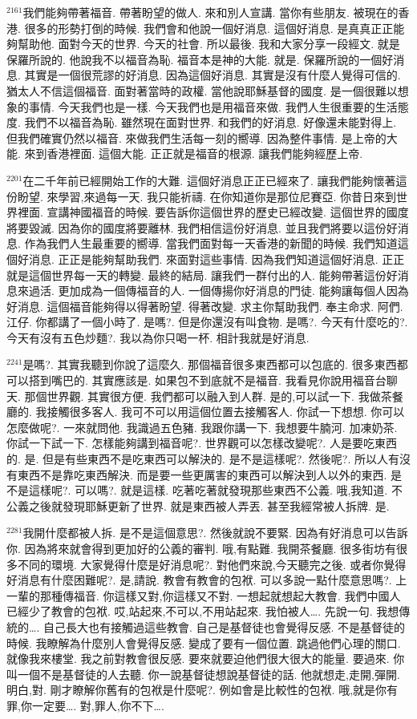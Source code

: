 \documentclass{book}
\begin{document}
$^{2161}$我們能夠帶著福音.
帶著盼望的做人.
來和別人宣講.
當你有些朋友.
被現在的香港.
很多的形勢打倒的時候.
我們會和他說一個好消息.
這個好消息.
是真真正正能夠幫助他.
面對今天的世界.
今天的社會.
所以最後.
我和大家分享一段經文.
就是保羅所說的.
他說我不以福音為恥.
福音本是神的大能.
就是.
保羅所說的一個好消息.
其實是一個很荒謬的好消息.
因為這個好消息.
其實是沒有什麼人覺得可信的.
猶太人不信這個福音.
面對著當時的政權.
當他說耶穌基督的國度.
是一個很難以想象的事情.
今天我們也是一樣.
今天我們也是用福音來做.
我們人生很重要的生活態度.
我們不以福音為恥.
雖然現在面對世界.
和我們的好消息.
好像還未能對得上.
但我們確實仍然以福音.
來做我們生活每一刻的嚮導.
因為整件事情.
是上帝的大能.
來到香港裡面.
這個大能.
正正就是福音的根源.
讓我們能夠經歷上帝.

$^{2201}$在二千年前已經開始工作的大難.
這個好消息正正已經來了.
讓我們能夠懷著這份盼望.
來學習,來過每一天.
我只能祈禱.
在你知道你是那位尼賽亞.
你昔日來到世界裡面.
宣講神國福音的時候.
要告訴你這個世界的歷史已經改變.
這個世界的國度將要毀滅.
因為你的國度將要離林.
我們相信這份好消息.
並且我們將要以這份好消息.
作為我們人生最重要的嚮導.
當我們面對每一天香港的新聞的時候.
我們知道這個好消息.
正正是能夠幫助我們.
來面對這些事情.
因為我們知道這個好消息.
正正就是這個世界每一天的轉變.
最終的結局.
讓我們一群付出的人.
能夠帶著這份好消息來過活.
更加成為一個傳福音的人.
一個傳揚你好消息的門徒.
能夠讓每個人因為好消息.
這個福音能夠得以得著盼望.
得著改變.
求主你幫助我們.
奉主命求.
阿們.
江仔.
你都講了一個小時了.
是嗎?.
但是你還沒有叫食物.
是嗎?.
今天有什麼吃的?.
今天有沒有五色炒麵?.
我以為你只喝一杯.
相計我就是好消息.

$^{2241}$是嗎?.
其實我聽到你說了這麼久.
那個福音很多東西都可以包底的.
很多東西都可以搭到嘴巴的.
其實應該是.
如果包不到底就不是福音.
我看見你說用福音台聊天.
那個世界觀.
其實很方便.
我們都可以融入到人群.
是的,可以試一下.
我做茶餐廳的.
我接觸很多客人.
我可不可以用這個位置去接觸客人.
你試一下想想.
你可以怎麼做呢?.
一來就問他.
我識過五色豬.
我跟你講一下.
我想要牛腩河.
加凍奶茶.
你試一下試一下.
怎樣能夠講到福音呢?.
世界觀可以怎樣改變呢?.
人是要吃東西的.
是.
但是有些東西不是吃東西可以解決的.
是不是這樣呢?.
然後呢?.
所以人有沒有東西不是靠吃東西解決.
而是要一些更厲害的東西可以解決到人以外的東西.
是不是這樣呢?.
可以嗎?.
就是這樣.
吃著吃著就發現那些東西不公義.
哦,我知道.
不公義之後就發現耶穌更新了世界.
就是東西被人弄丟.
甚至我經常被人拆牌.
是.

$^{2281}$我開什麼都被人拆.
是不是這個意思?.
然後就說不要緊.
因為有好消息可以告訴你.
因為將來就會得到更加好的公義的審判.
哦,有點難.
我開茶餐廳.
很多街坊有很多不同的環境.
大家覺得什麼是好消息呢?.
對他們來說,今天聽完之後.
或者你覺得好消息有什麼困難呢?.
是,請說.
教會有教會的包袱.
可以多說一點什麼意思嗎?.
上一輩的那種傳福音.
你這樣又對,你這樣又不對.
一想起就想起大教會.
我們中國人已經少了教會的包袱.
哎,站起來,不可以,不用站起來.
我怕被人….
先說一句.
我想傳統的….
自己長大也有接觸過這些教會.
自己是基督徒也會覺得反感.
不是基督徒的時候.
我瞭解為什麼別人會覺得反感.
變成了要有一個位置.
跳過他們心理的關口.
就像我來樓堂.
我之前對教會很反感.
要來就要迫他們很大很大的能量.
要過來.
你叫一個不是基督徒的人去聽.
你一說基督徒想說基督徒的話.
他就想走,走開,彈開.
明白,對.
剛才瞭解你舊有的包袱是什麼呢?.
例如會是比較性的包袱.
哦,就是你有罪,你一定要….
對,罪人,你不下….
\end{document}

